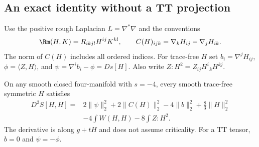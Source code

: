 \subsection{An exact identity without a TT projection}

Use the positive rough Laplacian $L=\nabla^*\nabla$ and the conventions
\[
 \Rm(H,K)=R_{ikjl}H^{ij}K^{kl},\qquad
 C(H)_{ijk}=\nabla_kH_{ij}-\nabla_jH_{ik}.
\]
The norm of $C(H)$ includes all ordered indices.  For trace-free $H$ set
$b_i=\nabla^jH_{ij}$, $\phi=\langle Z,H\rangle$, and
$\psi=\nabla^ib_i-\phi=Ds[H]$.  Also write
$Z:H^2=Z_{ij}H^i{}_kH^{kj}$.

\begin{proposition}
\label{webvar:scalar-hessian}
On any smooth closed four-manifold with $s=-4$, every smooth
trace-free symmetric $H$ satisfies
\begin{equation}\label{webvar:scalar-hessian-formula}
 \begin{split}
 D^2S[H,H]={}&2\|\psi\|_2^2+2\|C(H)\|_2^2-4\|b\|_2^2
              +\frac83\|H\|_2^2\\
 &-4\int W(H,H)-8\int Z:H^2 .
 \end{split}
\end{equation}
The derivative is along $g+tH$ and does not assume criticality.
For a TT tensor, $b=0$ and $\psi=-\phi$.
\end{proposition}
